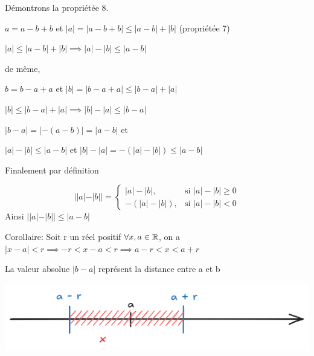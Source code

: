 \documentclass[a4paper, 12pt]{article}
\begin{document}
Démontrons la propriétée 8.

\begin{demonstration}
    $a = a - b + b$ \quad et \quad $|a| = |a - b + b| \leq |a - b| + |b|$ (propriétée 7)

    $|a| \leq |a - b| + |b| \implies |a| - |b| \leq |a - b|$

    \vspace{0.5em}
    de même, 
    \vspace{0.5em}
    
    $b = b - a + a$ \quad et \quad $|b| = |b - a + a| \leq |b - a| + |a|$
    
    $|b| \leq |b - a| + |a| \implies |b| - |a| \leq |b - a|$
    
    \vspace{0.5em}

    $|b - a| = |-(a-b)| = |a-b|$ et
    
    $|a| - |b| \leq |a-b|$ \quad et \quad $|b| - |a| = -(|a| - |b|) \leq |a-b|$

    Finalement par définition

    \begin{rdem}
        \begin{equation*}
            ||a|-|b|| =
            \begin{cases}
                |a| - |b|, & \text{si } |a| - |b| \geq 0 \\
                -(|a| - |b|), & \text{si } |a| - |b| \lt 0
            \end{cases}
        \end{equation*}
        Ainsi $||a| - |b|| \leq |a - b|$
    \end{rdem}
\end{demonstration}

Corollaire: Soit r un réel positif $\forall x, a \in \mathbb{R}$, on a 
$|x - a| \lt r \implies -r \lt x - a \lt r \implies a-r \lt x \lt a + r$

\begin{remark}
    La valeur absolue $|b - a|$ représent la distance entre a et b
\end{remark}

\includegraphics[width=\textwidth]{../images/neightborhood.png}
\end{document}
